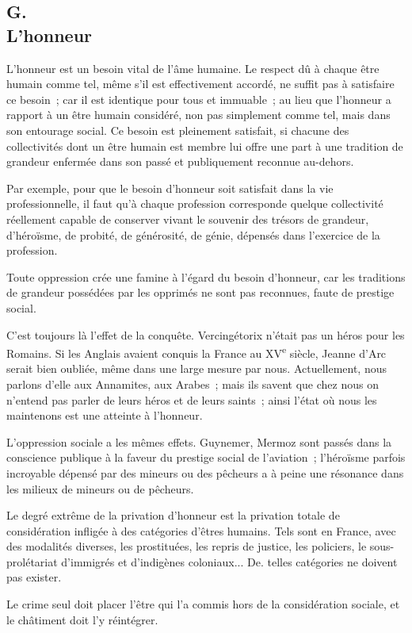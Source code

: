 \documentclass[french,twoside]{book} %
\begin{document}
\subsection[{G. L’honneur}]{G. \\
L’honneur}
\noindent \par
L'honneur est un besoin vital de l'âme humaine. Le respect dû à chaque être humain comme tel, même s'il est effectivement accordé, ne suffit pas à satisfaire ce besoin ; car il est identique pour tous et immuable ; au lieu que l'honneur a rapport à un être humain considéré, non pas simplement comme tel, mais dans son entourage social. Ce besoin est pleinement satisfait, si chacune des collectivités dont un être humain est membre lui offre une part à une tradition de grandeur enfermée dans son passé et publiquement reconnue au-dehors.\par
Par exemple, pour que le besoin d'honneur soit satisfait dans la vie professionnelle, il faut qu'à chaque profession corresponde quelque collectivité réellement capable de conserver vivant le souvenir des trésors de grandeur, d'héroïsme, de probité, de générosité, de génie, dépensés dans l'exercice de la profession.\par
Toute oppression crée une famine à l'égard du besoin d'honneur, car les traditions de grandeur possédées par les opprimés ne sont pas reconnues, faute de prestige social.\par
C'est toujours là l'effet de la conquête. Vercingétorix n'était pas un héros pour les Romains. Si les Anglais avaient conquis la France au XV\textsuperscript{e} siècle, Jeanne d'Arc serait bien oubliée, même dans une large mesure par nous. Actuellement, nous parlons d'elle aux Annamites, aux Arabes ; mais ils savent que chez nous on n'entend pas parler de leurs héros et de leurs saints ; ainsi l'état où nous les maintenons est une atteinte à l'honneur.\par
L'oppression sociale a les mêmes effets. Guynemer, Mermoz sont passés dans la conscience publique à la faveur du prestige social de l'aviation ; l'héroïsme parfois incroyable dépensé par des mineurs ou des pêcheurs a à peine une résonance dans les milieux de mineurs ou de pêcheurs.\par
Le degré extrême de la privation d'honneur est la privation totale de considération infligée à des catégories d'êtres humains. Tels sont en France, avec des modalités diverses, les prostituées, les repris de justice, les policiers, le sous-prolétariat d'immigrés et d'indigènes coloniaux... De. telles catégories ne doivent pas exister.\par
Le crime seul doit placer l'être qui l'a commis hors de la considération sociale, et le châtiment doit l'y réintégrer.
\end{document}
